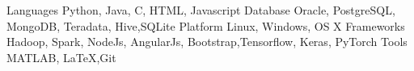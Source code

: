  \begin{cvskills}
     \cvskill
     {Languages}
     {Python, Java, C, HTML, Javascript}
     \cvskill
     {Database}
     {Oracle, PostgreSQL, MongoDB, Teradata, Hive,SQLite}
     \cvskill
     {Platform}
     {Linux, Windows, OS X}
     \cvskill
     {Frameworks}
     {Hadoop, Spark, NodeJs, AngularJs, Bootstrap,Tensorflow, Keras, PyTorch}
     \cvskill
     {Tools}
     {MATLAB, \LaTeX{},Git}
 \end{cvskills}


